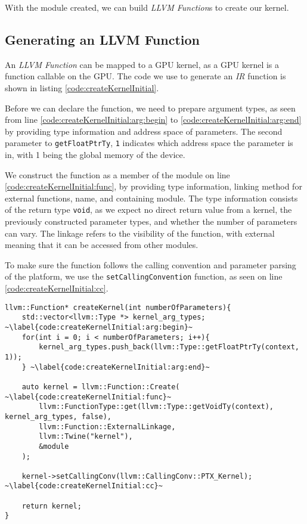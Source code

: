 With the module created, we can build \textit{LLVM Function}s to create our kernel.

\subsection{Generating an LLVM Function} \label{sec:irFunction}
An \textit{LLVM Function} can be mapped to a GPU kernel, as a GPU kernel is a function callable on the GPU. The code we use to generate an \textit{IR} function is shown in listing \ref{code:createKernelInitial}. 

Before we can declare the function, we need to prepare argument types, as seen from line \ref{code:createKernelInitial:arg:begin} to \ref{code:createKernelInitial:arg:end} by providing type information and address space of parameters. The second parameter to \texttt{getFloatPtrTy}, \texttt{1} indicates which address space the parameter is in, with 1 being the global memory of the device.

We construct the function as a member of the module on line \ref{code:createKernelInitial:func}, by providing type information, linking method for external functions, name, and containing module. The type information consists of the return type \texttt{void}, as we expect no direct return value from a kernel, the previously constructed parameter types, and whether the number of parameters can vary. The linkage refers to the visibility of the function, with external meaning that it can be accessed from other modules.

To make sure the function follows the calling convention and parameter parsing of the platform, we use the \texttt{setCallingConvention} function, as seen on line \ref{code:createKernelInitial:cc}. 

\begin{lstlisting}[caption={The createKernel function.}, label={code:createKernelInitial}]
llvm::Function* createKernel(int numberOfParameters){
    std::vector<llvm::Type *> kernel_arg_types; ~\label{code:createKernelInitial:arg:begin}~
    for(int i = 0; i < numberOfParameters; i++){
        kernel_arg_types.push_back(llvm::Type::getFloatPtrTy(context, 1));
    } ~\label{code:createKernelInitial:arg:end}~

    auto kernel = llvm::Function::Create( ~\label{code:createKernelInitial:func}~
        llvm::FunctionType::get(llvm::Type::getVoidTy(context), kernel_arg_types, false),
        llvm::Function::ExternalLinkage,
        llvm::Twine("kernel"),
        &module
    );

    kernel->setCallingConv(llvm::CallingConv::PTX_Kernel); ~\label{code:createKernelInitial:cc}~

    return kernel;
}
\end{lstlisting}

